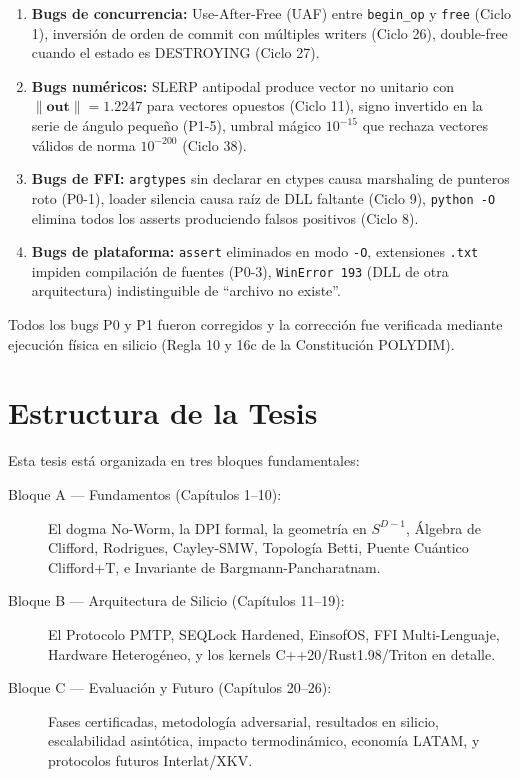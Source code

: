 \begin{enumerate}
\item \textbf{Bugs de concurrencia:} Use-After-Free (UAF) entre \texttt{begin\_op} y \texttt{free}
(Ciclo 1), inversión de orden de commit con múltiples writers (Ciclo 26),
double-free cuando el estado es DESTROYING (Ciclo 27).

\item \textbf{Bugs numéricos:} SLERP antipodal produce vector no unitario con
$\|{\mathbf{out}\|} = 1.2247$ para vectores opuestos (Ciclo 11),
signo invertido en la serie de ángulo pequeño (P1-5),
umbral mágico $10^{-15}$ que rechaza vectores válidos de norma $10^{-200}$ (Ciclo 38).

\item \textbf{Bugs de FFI:} \texttt{argtypes} sin declarar en ctypes causa
marshaling de punteros roto (P0-1), loader silencia causa raíz de DLL faltante
(Ciclo 9), \texttt{python -O} elimina todos los asserts produciendo falsos positivos (Ciclo 8).

\item \textbf{Bugs de plataforma:} \texttt{assert} eliminados en modo \texttt{-O},
extensiones \texttt{.txt} impiden compilación de fuentes (P0-3),
\texttt{WinError 193} (DLL de otra arquitectura) indistinguible de ``archivo no existe''.
\end{enumerate}

Todos los bugs P0 y P1 fueron corregidos y la corrección fue verificada mediante
ejecución física en silicio (Regla 10 y 16c de la Constitución POLYDIM).

\section{Estructura de la Tesis}

Esta tesis está organizada en tres bloques fundamentales:

\begin{description}
\item[Bloque A — Fundamentos (Capítulos 1--10):] El dogma No-Worm, la DPI formal,
la geometría en $S^{D-1}$, Álgebra de Clifford, Rodrigues, Cayley-SMW,
Topología Betti, Puente Cuántico Clifford+T, e Invariante de Bargmann-Pancharatnam.

\item[Bloque B — Arquitectura de Silicio (Capítulos 11--19):] El Protocolo PMTP,
SEQLock Hardened, EinsofOS, FFI Multi-Lenguaje, Hardware Heterogéneo,
y los kernels C++20/Rust1.98/Triton en detalle.

\item[Bloque C — Evaluación y Futuro (Capítulos 20--26):] Fases certificadas,
metodología adversarial, resultados en silicio, escalabilidad asintótica,
impacto termodinámico, economía LATAM, y protocolos futuros Interlat/XKV.
\end{description}

